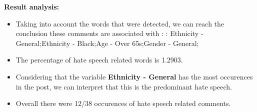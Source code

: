 \documentclass[11pt]{article}
\begin{document}
\textbf{\Large Result analysis:}

\begin{itemize}\item Taking into account the words that were detected, we can reach the conclusion these comments are associated with : : Ethnicity - General;Ethnicity - Black;Age - Over 65s;Gender - General;%

\item The percentage of hate speech related words is 1.2903.

\item Considering that the variable \textbf{Ethnicity - General} has the most occurences in the post, we can interpret that this is the predominant hate speech.

\item Overall there were 12/38 occurences of hate speech related comments.\end{itemize}
\end{document}
